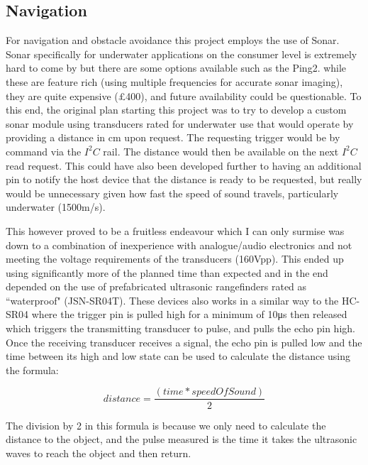 \documentclass[11pt,a4paper,titlepage]{report}
\begin{document}
	\subsection*{Navigation}
	For navigation and obstacle avoidance this project employs the use of Sonar. Sonar specifically for underwater applications on the consumer level is extremely hard to come by but there are some options available such as the Ping2\cite{PING2}. while these are feature rich (using multiple frequencies for accurate sonar imaging), they are quite expensive (\unit{\approx}£400), and future availability could be questionable. To this end, the original plan starting this project was to try to develop a custom sonar module using transducers rated for underwater use\cite{ALUMINIUM_TRANSDUCER} that would operate by providing a distance in \unit{\centi\metre} upon request. The requesting trigger would be by command via the $I^{2}C$ rail. The distance would then be available on the next $I^{2}C$ read request. This could have also been developed further to having an additional pin to notify the host device that the distance is ready to be requested, but really would be unnecessary given how fast the speed of sound travels, particularly underwater (\unit{\approx}1500\unit{\metre}/\unit{\second}). 
	
	This however proved to be a fruitless endeavour which I can only surmise was down to a combination of inexperience with analogue/audio electronics and not meeting the voltage requirements of the transducers (160\unit{\volt}pp). This ended up using significantly more of the planned time than expected and in the end depended on the use of prefabricated ultrasonic rangefinders rated as ``waterproof" (JSN-SR04T\cite{JSN_SR04T}). These devices also works in a similar way to the HC-SR04\cite{HC_SR04} where the trigger pin is pulled high for a minimum of 10\unit{\micro\second} then released which triggers the transmitting transducer to pulse, and pulls the echo pin high. Once the receiving transducer receives a signal, the echo pin is pulled low and the time between its high and low state can be used to calculate the distance using the formula:
	
	$$
	distance = \frac{(time * speedOfSound)}{2}
	$$	
	
	The division by 2 in this formula is because we only need to calculate the distance to the object, and the pulse measured is the time it takes the ultrasonic waves to reach the object and then return.
	
\end{document}
